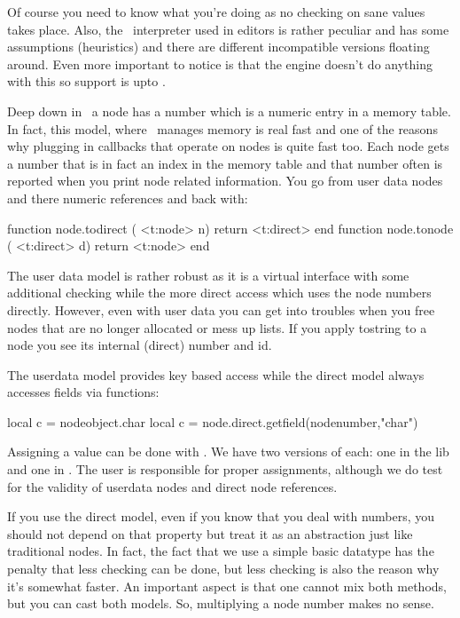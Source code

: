 Of course you need to know what you're doing as no checking on sane values takes
place. Also, the \SYNCTEX\ interpreter used in editors is rather peculiar and has
some assumptions (heuristics) and there are different incompatible versions
floating around. Even more important to notice is that the engine doesn't do
anything with this so support is upto \LUA.

\stopsubsection

\startsubsection[title={Two access models}]

Deep down in \TEX\ a node has a number which is a numeric entry in a memory
table. In fact, this model, where \TEX\ manages memory is real fast and one of
the reasons why plugging in callbacks that operate on nodes is quite fast too.
Each node gets a number that is in fact an index in the memory table and that
number often is reported when you print node related information. You go from
user data nodes and there numeric references and back with:

\starttyping[option=LUA]
function node.todirect ( <t:node>   n) return <t:direct> end
function node.tonode   ( <t:direct> d) return <t:node>   end
\stoptyping

The user data model is rather robust as it is a virtual interface with some
additional checking while the more direct access which uses the node numbers
directly. However, even with user data you can get into troubles when you free
nodes that are no longer allocated or mess up lists. If you apply \type
{tostring} to a node you see its internal (direct) number and id.

The userdata model provides key based access while the direct model always
accesses fields via functions:

\starttyping[option=LUA]
local c = nodeobject.char
local c = node.direct.getfield(nodenumber,"char")
\stoptyping

Assigning a value can be done with . We have two versions of
each: one in the  lib and one in . The user is
responsible for proper assignments, although we do test for the validity of
userdata nodes and direct node references.

If you use the direct model, even if you know that you deal with numbers, you
should not depend on that property but treat it as an abstraction just like
traditional nodes. In fact, the fact that we use a simple basic datatype has the
penalty that less checking can be done, but less checking is also the reason why
it's somewhat faster. An important aspect is that one cannot mix both methods,
but you can cast both models. So, multiplying a node number makes no sense.

